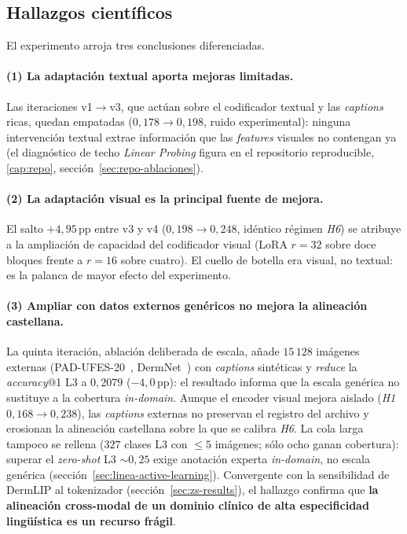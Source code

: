 \subsection{Hallazgos científicos}
\label{sec:spanderm-escala-especificidad}

El experimento arroja tres conclusiones diferenciadas.

\paragraph{(1) La adaptación textual aporta mejoras limitadas.}
Las iteraciones v1$\to$v3, que actúan sobre el codificador textual y
las \emph{captions} ricas, quedan empatadas ($0{,}178 \to 0{,}198$,
ruido experimental): ninguna intervención textual extrae información que
las \emph{features} visuales no contengan ya (el diagnóstico de techo
\emph{Linear Probing} figura en el repositorio reproducible,
\ref{cap:repo}, sección~\ref{sec:repo-ablaciones}).

\paragraph{(2) La adaptación visual es la principal fuente de mejora.}
El salto $+4{,}95$\,pp entre v3 y v4 ($0{,}198 \to 0{,}248$, idéntico
régimen \emph{H6}) se atribuye a la ampliación de capacidad del
codificador visual (LoRA $r=32$ sobre doce bloques frente a $r=16$ sobre
cuatro). El cuello de botella era visual, no textual: es la palanca de
mayor efecto del experimento.

\paragraph{(3) Ampliar con datos externos genéricos no mejora la
alineación castellana.} La quinta iteración, ablación deliberada de
escala, añade $15\,128$ imágenes externas
(PAD-UFES-20~\cite{padufes}, DermNet~\cite{dermnet}) con
\emph{captions} sintéticas y \emph{reduce} la \emph{accuracy}@1 L3 a
$0{,}2079$ ($-4{,}0$\,pp): el resultado informa que la escala genérica
no sustituye a la cobertura \emph{in-domain}. Aunque el encoder visual mejora aislado
(\emph{H1} $0{,}168 \to 0{,}238$), las \emph{captions} externas no
preservan el registro del archivo y erosionan la alineación castellana
sobre la que se calibra \emph{H6}. La cola larga tampoco se rellena
($327$ clases L3 con $\leq 5$ imágenes; sólo ocho ganan cobertura):
superar el \emph{zero-shot} L3 $\sim 0{,}25$ exige anotación experta
\emph{in-domain}, no escala genérica
(sección~\ref{sec:linea-active-learning}). Convergente con la
sensibilidad de DermLIP al tokenizador
(sección~\ref{sec:zs-results}), el hallazgo confirma que \textbf{la
alineación cross-modal de un dominio clínico de alta especificidad
lingüística es un recurso frágil}.

